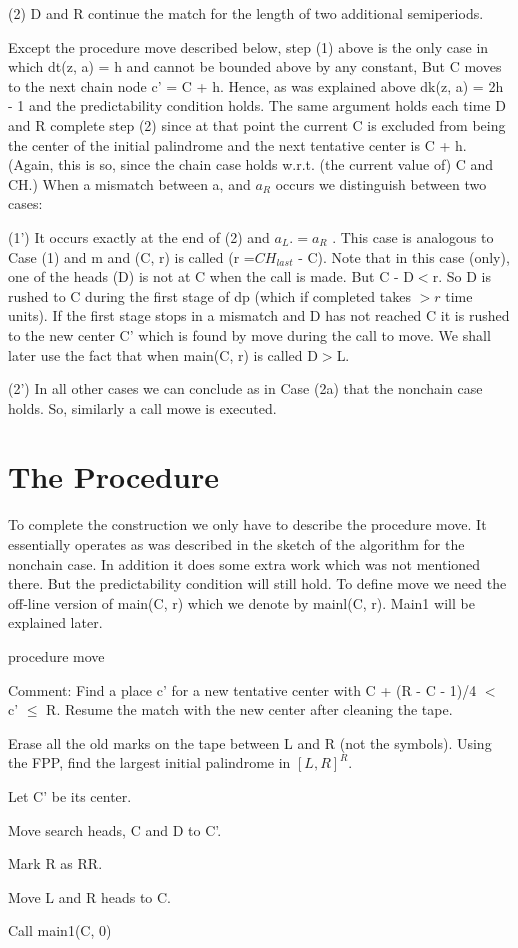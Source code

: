\documentclass[11pt,a4paper]{report}
\begin{document}
(2) D and R continue the match for the length of two additional semiperiods.

Except the procedure move described below, step (1) above is the only case in which
dt(z, a) = h and cannot be bounded above by any constant, But C moves to the next
chain node c’ = C + h. Hence, as was explained above dk(z, a) = 2h - 1 and the
predictability condition holds. The same argument holds each time D and R complete
step (2) since at that point the current C is excluded from being the center of the initial
palindrome and the next tentative center is C + h. (Again, this is so, since the chain case 
holds w.r.t. (the current value of) C and CH.) When a mismatch between a, and $a_R$
occurs we distinguish between two cases:

(1’) It occurs exactly at the end of (2) and $a_L. = a_R$ . This case is analogous to
Case (1) and m and (C, r) is called (r =$CH_{last}$ - C). Note that in this case (only), one
of the heads (D) is not at C when the call is made. But C - D$<$r. So D is rushed to C
during the first stage of dp (which if completed takes $>r$ time units). If the first stage
stops in a mismatch and D has not reached C it is rushed to the new center C’ which is
found by move during the call to move. We shall later use the fact that when main(C, r)
is called D$>$L.

(2’) In all other cases we can conclude as in Case (2a) that the nonchain case holds.
So, similarly a call mowe is executed. 





\chapter{The Procedure}

To complete the construction we only have to describe the procedure move. It essentially
operates as was described in the sketch of the algorithm for the nonchain case. In addition
it does some extra work which was not mentioned there. But the predictability condition
will still hold. To define move we need the off-line version of main(C, r) which we denote
by mainl(C, r). Main1 will be explained later.


procedure move
\begin{myindentpar}{2em}
Comment: Find a place c’ for a new tentative center with
C + (R - C - 1)/4 $<$ c’ $\leq$ R. Resume the match with the new center
after cleaning the tape.

Erase all the old marks on the tape between L and R (not the symbols).
Using the FPP, find the largest initial palindrome in $[L, R]^R$.

Let C’ be its center.

Move search heads, C and D to C’.

Mark R as RR.

Move L and R heads to C.

Call main1(C, 0)
\end{myindentpar}
\end{document}
